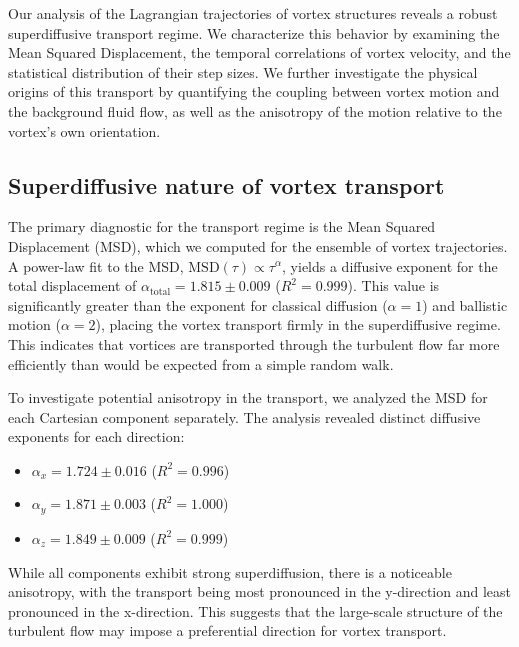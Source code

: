 \documentclass[]{article}
\begin{document}
Our analysis of the Lagrangian trajectories of vortex structures reveals a robust superdiffusive transport regime. We characterize this behavior by examining the Mean Squared Displacement, the temporal correlations of vortex velocity, and the statistical distribution of their step sizes. We further investigate the physical origins of this transport by quantifying the coupling between vortex motion and the background fluid flow, as well as the anisotropy of the motion relative to the vortex's own orientation.

\subsection{Superdiffusive nature of vortex transport}
The primary diagnostic for the transport regime is the Mean Squared Displacement (MSD), which we computed for the ensemble of vortex trajectories. A power-law fit to the MSD, $\text{MSD}(\tau) \propto \tau^\alpha$, yields a diffusive exponent for the total displacement of $\alpha_{\text{total}} = 1.815 \pm 0.009$ ($R^2 = 0.999$). This value is significantly greater than the exponent for classical diffusion ($\alpha=1$) and ballistic motion ($\alpha=2$), placing the vortex transport firmly in the superdiffusive regime. This indicates that vortices are transported through the turbulent flow far more efficiently than would be expected from a simple random walk.

To investigate potential anisotropy in the transport, we analyzed the MSD for each Cartesian component separately. The analysis revealed distinct diffusive exponents for each direction:
\begin{itemize}
    \item $\alpha_x = 1.724 \pm 0.016$ ($R^2 = 0.996$)
    \item $\alpha_y = 1.871 \pm 0.003$ ($R^2 = 1.000$)
    \item $\alpha_z = 1.849 \pm 0.009$ ($R^2 = 0.999$)
\end{itemize}
While all components exhibit strong superdiffusion, there is a noticeable anisotropy, with the transport being most pronounced in the y-direction and least pronounced in the x-direction. This suggests that the large-scale structure of the turbulent flow may impose a preferential direction for vortex transport.
\end{document}
